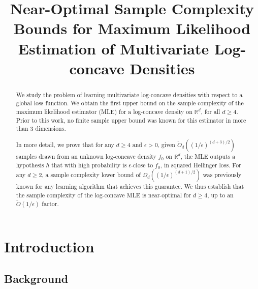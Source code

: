 \documentclass[final,12pt]{colt2018}
\title[On the MLE of Multivariate Log-concave Densities]{Near-Optimal Sample Complexity Bounds for Maximum Likelihood Estimation of 
Multivariate Log-concave Densities}
\newtheorem{informal theorem}[theorem]{Theorem (informal statement)}
\newcommand{\R}{\mathbb{R}}
\newcommand{\eps}{\epsilon}
\begin{document}
\maketitle




\begin{abstract}
We study the problem of learning multivariate log-concave densities
with respect to a global loss function. We obtain the first upper bound on the sample complexity 
of the maximum likelihood estimator (MLE) for a log-concave density on $\R^d$, for all $d \geq 4$.
Prior to this work, no finite sample upper bound was known for this estimator in more than $3$ dimensions.

In more detail, we prove that for any $d \geq 4$ and $\eps>0$, given 
$\tilde{O}_d((1/\eps)^{(d+3)/2})$ samples drawn from an unknown log-concave density $f_0$ on $\R^d$,
the MLE outputs a hypothesis $h$ that with high probability is $\eps$-close
to $f_0$, in squared Hellinger loss. For any $d \geq 2$, a sample complexity lower bound of $\Omega_d((1/\eps)^{(d+1)/2})$
was previously known for any learning algorithm that achieves this guarantee. 
We thus establish that the sample complexity of the log-concave MLE is near-optimal for $d \geq 4$, 
up to an $\tilde{O}(1/\eps)$ factor.
\end{abstract}






\section{Introduction} \label{sec:intro}

\subsection{Background}
\end{document}
